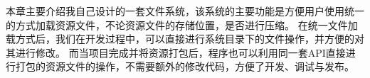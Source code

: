 本章主要介绍我自己设计的一套文件系统，该系统的主要功能是方便用户使用统一的方式加载资源文件，不论资源文件的存储位置，是否进行压缩。
在统一文件加载方式后，我们在开发过程中，可以直接进行系统目录下的文件操作，并方便的对其进行修改。
而当项目完成并将资源打包后，程序也可以利用同一套API直接进行打包的资源文件的操作，不需要额外的修改代码，方便了开发、调试与发布。